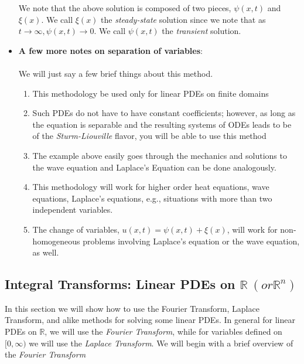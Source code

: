 \begin{itemize}
We note that the above solution is composed of two pieces, $\psi(x,t)$ and $\xi(x).$ We call $\xi(x)$ the \emph{steady-state} solution since we note that as $t\rightarrow\infty, \psi(x,t)\rightarrow 0$. We call $\psi(x,t)$ the \emph{transient} solution.

%
%
\item[] {\bf{A few more notes on separation of variables}}: \\ \\

We will just say a few brief things about this method.
\begin{enumerate}
\item This methodology be used only for linear PDEs on finite domains
\item Such PDEs do not have to have constant coefficients; however, as long as the equation is separable and the resulting systems of ODEs leads to be of the \emph{Sturm-Liouville} flavor, you will be able to use this method
\item The example above easily goes through the mechanics and solutions to the wave equation and Laplace's Equation can be done analogously.
\item This methodology will work for higher order heat equations, wave equations, Laplace's equations, e.g., situations with more than two independent variables.
\item The change of variables, $u(x,t) = \psi(x,t) + \xi(x)$, will work for non-homogeneous problems involving Laplace's equation or the wave equation, as well.
\end{enumerate}


\end{itemize} %


%
%

\subsection{Integral Transforms: Linear PDEs on $\mathbb{R}\ (or \mathbb{R}^n)$}

In this section we will show how to use the Fourier Transform, Laplace Transform, and alike methods for solving some linear PDEs. In general for linear PDEs on $\mathbb{R}$, we will use the \emph{Fourier Transform}, while for variables defined on $[0,\infty)$ we will use the \emph{Laplace Transform}. We will begin with a brief overview of the \emph{Fourier Transform}

